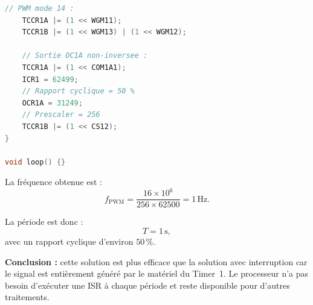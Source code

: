 \documentclass[a4paper,11pt]{article}
\begin{document}
\begin{itemize}
\begin{solution}
\begin{lstlisting}[language=C++]
    // PWM mode 14 :
    TCCR1A |= (1 << WGM11);
    TCCR1B |= (1 << WGM13) | (1 << WGM12);

    // Sortie OC1A non-inversee :
    TCCR1A |= (1 << COM1A1);
    ICR1 = 62499;
    // Rapport cyclique = 50 %
    OCR1A = 31249;
    // Prescaler = 256
    TCCR1B |= (1 << CS12);
}

void loop() {}
        \end{lstlisting}

        La fréquence obtenue est :
        \[
            f_{\mathrm{PWM}}
            =
            \frac{16\times10^6}
                 {256\times62500}
            =
            \boxed{1\,\mathrm{Hz}}.
        \]

        La période est donc :
        \[
            \boxed{T=1\,\mathrm{s}},
        \]
        avec un rapport cyclique d'environ \(50\,\%\).

        \medskip
        \textbf{Conclusion :} cette solution est plus efficace que la solution
        avec interruption car le signal est entièrement généré par le matériel
        du Timer~1. Le processeur n'a pas besoin d'exécuter une ISR à chaque
        période et reste disponible pour d'autres traitements.
    \end{solution}
\end{itemize}
    
\end{document}
